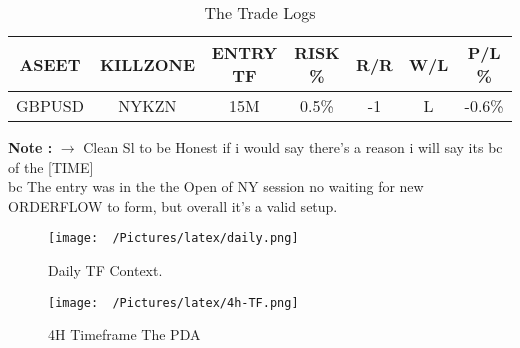 \documentclass{article}
\begin{document}
\begin{table}[h!]
\begin{center}
  \label{tab:my_label}
  \vspace{0.3cm}
\begin{tabular}{|c|c|c|c|c|c|c|}
  \toprule
  \textbf{ASEET} & \textbf{KILLZONE} & \textbf{ENTRY TF}  & \textbf{RISK \%} & \textbf{R/R} & \textbf{W/L} & \textbf{P/L \%} \\
  \midrule
  GBPUSD & NYKZN & 15M & 0.5\% & -1 & L & -0.6\% \\
  \bottomrule
\end{tabular}
  \caption{The Trade Logs}
\end{center}
\end{table}

\begin{center}
\begin{mdframed}[style=MyQuoteFrame]
  \textbf{Note :} $\rightarrow$ Clean Sl to be Honest if i would say there's a reason i will say its bc of the [TIME]  \\ bc The entry was in the the Open of NY session no waiting for new ORDERFLOW to form, but overall it's a valid setup. 
\end{mdframed}
\end{center}
\vspace{0.2cm}
\newpage

\centering
\vspace{0.1cm}
\begin{figure}[h!]
\caption{Daily TF Context.}
\begin{adjustbox}{width=1.1\textwidth,center}
  \texttt{[image: ~/Pictures/latex/daily.png]}
\end{adjustbox}
  \label{fig:image}
\end{figure}

\begin{figure}[h!]
\caption{4H Timeframe The PDA}
  \begin{adjustbox}{width=1.1\textwidth,center}
  \texttt{[image: ~/Pictures/latex/4h-TF.png]}
\end{adjustbox}
\label{fig:image}
\end{figure}
\end{document}
